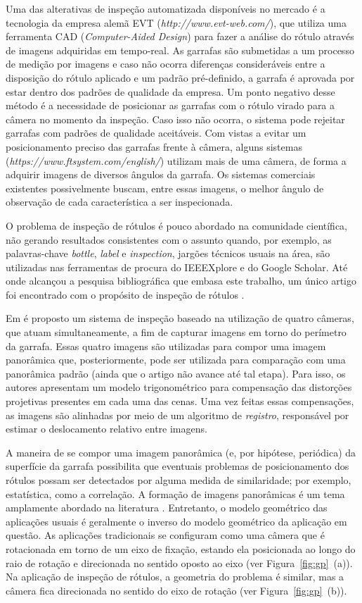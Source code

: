     Uma das alterativas de inspeção automatizada disponíveis no mercado é a tecnologia da empresa alemã EVT (\textit{http://www.evt-web.com/}), que utiliza uma ferramenta CAD  (\textit{Computer-Aided Design}) para fazer a análise do rótulo através de imagens adquiridas em tempo-real. 
    As garrafas são submetidas a um processo de medição por imagens e caso não ocorra diferenças consideráveis entre a disposição do rótulo aplicado e um padrão pré-definido, a garrafa é aprovada por estar dentro dos padrões de qualidade da empresa. Um ponto negativo desse método é a necessidade de posicionar as garrafas com o rótulo virado para a câmera no momento da inspeção. Caso isso não ocorra, o sistema pode rejeitar garrafas com padrões de qualidade aceitáveis. Com vistas a evitar um posicionamento preciso das garrafas frente à câmera, alguns sistemas (\textit{https://www.ftsystem.com/english/}) utilizam mais de uma câmera, de forma a adquirir imagens de diversos ângulos da garrafa. Os sistemas comerciais  existentes possivelmente buscam, entre essas imagens, o melhor ângulo de observação de cada característica a ser inspecionada.
    
    O problema de inspeção de rótulos é pouco abordado na comunidade científica, não gerando resultados consistentes com o assunto quando, por exemplo, as palavras-chave \textit{bottle}, \textit{label} e \textit{inspection}, jargões técnicos usuais na área, são utilizadas nas ferramentas de procura do IEEEXplore e do Google Scholar. Até onde alcançou a pesquisa bibliográfica que embasa este trabalho, um único artigo foi encontrado com o propósito de inspeção de rótulos \cite{Lin:2013}.  
    
    Em \cite{Lin:2013} é proposto um sistema de inspeção baseado na utilização de quatro câmeras, que atuam simultaneamente, a fim de capturar imagens em torno do perímetro da garrafa. Essas quatro imagens são utilizadas para compor uma imagem panorâmica que, posteriormente, pode ser utilizada para comparação com uma panorâmica padrão (ainda que o artigo não avance até tal etapa). Para isso, os autores apresentam um modelo trigonométrico para compensação das distorções projetivas presentes em cada uma das cenas. Uma vez feitas essas compensações, as imagens são alinhadas por meio de um algoritmo de \textit{registro}, responsável por estimar o deslocamento relativo entre imagens. 
    
    A maneira de se compor uma imagem panorâmica (e, por hipótese, periódica) da superfície da garrafa possibilita que eventuais problemas de posicionamento dos rótulos possam ser detectados por alguma medida de similaridade; por exemplo, estatística, como a correlação. A formação de imagens panorâmicas é um tema amplamente abordado na literatura \cite{Lee:2001, Park:2013}. Entretanto, o modelo geométrico das aplicações usuais é geralmente o inverso do modelo geométrico da aplicação em questão. As aplicações tradicionais se configuram como uma câmera que é rotacionada em torno de um eixo de fixação, estando ela posicionada ao longo do raio de rotação e direcionada no sentido oposto ao eixo (ver Figura~\ref{fig:gp}~(a)). Na aplicação de inspeção de rótulos, a geometria do problema é similar, mas a câmera fica direcionada no sentido do eixo de rotação (ver Figura~\ref{fig:gp}~(b)).
    

